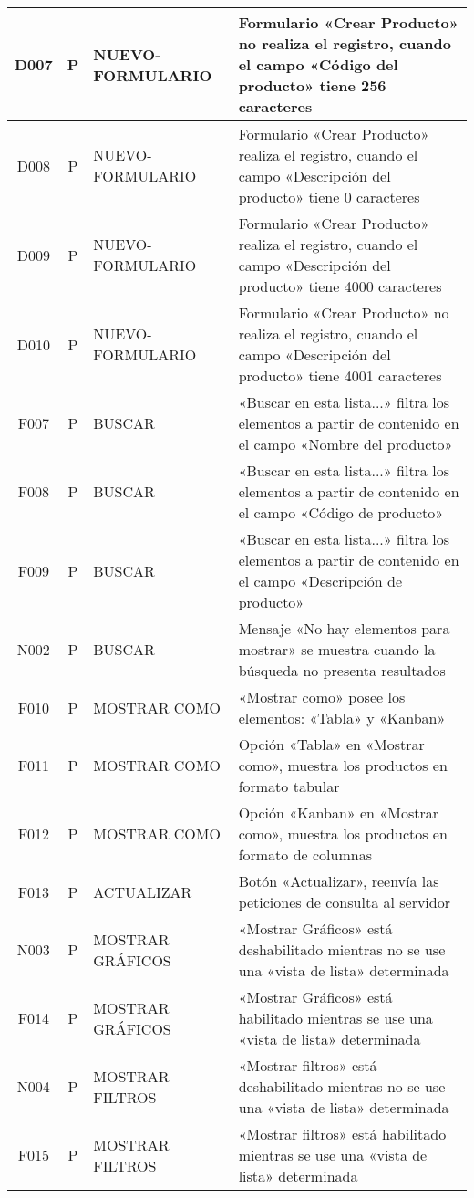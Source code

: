 \begin{landscape}
{\begin{longtable}[htb]{|c|c|p{5.0cm}|p{14.0cm}|}
D007 & P & NUEVO-FORMULARIO & Formulario «Crear Producto» no realiza el registro, cuando el campo «Código del producto» tiene 256 caracteres \\ \hline
D008 & P & NUEVO-FORMULARIO & Formulario «Crear Producto» realiza el registro, cuando el campo «Descripción del producto» tiene 0 caracteres \\ \hline
D009 & P & NUEVO-FORMULARIO & Formulario «Crear Producto» realiza el registro, cuando el campo «Descripción del producto» tiene 4000 caracteres \\ \hline
D010 & P & NUEVO-FORMULARIO & Formulario «Crear Producto» no realiza el registro, cuando el campo «Descripción del producto» tiene 4001 caracteres \\ \hline
F007 & P & BUSCAR & «Buscar en esta lista...» filtra los elementos a partir de contenido en el campo «Nombre del producto» \\ \hline
F008 & P & BUSCAR & «Buscar en esta lista...» filtra los elementos a partir de contenido en el campo «Código de producto» \\ \hline
F009 & P & BUSCAR & «Buscar en esta lista...» filtra los elementos a partir de contenido en el campo «Descripción de producto» \\ \hline
N002 & P & BUSCAR & Mensaje «No hay elementos para mostrar» se muestra cuando la búsqueda no presenta resultados \\ \hline
F010 & P & MOSTRAR COMO & «Mostrar como» posee los elementos: «Tabla» y «Kanban» \\ \hline
F011 & P & MOSTRAR COMO & Opción «Tabla» en «Mostrar como», muestra los productos en formato tabular \\ \hline
F012 & P & MOSTRAR COMO & Opción «Kanban» en «Mostrar como», muestra los productos en formato de columnas \\ \hline
F013 & P & ACTUALIZAR & Botón «Actualizar», reenvía las peticiones de consulta al servidor \\ \hline
N003 & P & MOSTRAR GRÁFICOS & «Mostrar Gráficos» está deshabilitado mientras no se use una «vista de lista» determinada \\ \hline
F014 & P & MOSTRAR GRÁFICOS & «Mostrar Gráficos» está habilitado mientras se use una «vista de lista» determinada \\ \hline
N004 & P & MOSTRAR FILTROS & «Mostrar filtros» está deshabilitado mientras no se use una «vista de lista» determinada \\ \hline
F015 & P & MOSTRAR FILTROS & «Mostrar filtros» está habilitado mientras se use una «vista de lista» determinada \\ \hline

\end{longtable}}
\end{landscape}
